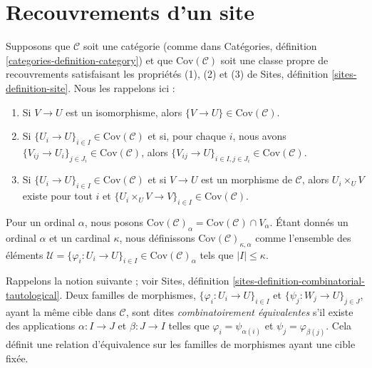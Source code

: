 \section{Recouvrements d'un site}
\label{section-coverings-site}

\noindent
Supposons que $\mathcal{C}$ soit une catégorie (comme dans Catégories,
définition \ref{categories-definition-category}) et que
$\text{Cov}(\mathcal{C})$ soit une classe propre de recouvrements satisfaisant
les propriétés (1), (2) et (3) de Sites,
définition \ref{sites-definition-site}. Nous les rappelons ici :
\begin{enumerate}
\item Si $V \to U$ est un isomorphisme, alors $\{V \to U\} \in
\text{Cov}(\mathcal{C})$.
\item Si $\{U_i \to U\}_{i\in I} \in \text{Cov}(\mathcal{C})$ et si, pour
chaque $i$, nous avons
$\{V_{ij} \to U_i\}_{j\in J_i} \in \text{Cov}(\mathcal{C})$, alors
$\{V_{ij} \to U\}_{i \in I, j\in J_i} \in \text{Cov}(\mathcal{C})$.
\item Si $\{U_i \to U\}_{i\in I}\in \text{Cov}(\mathcal{C})$ et si
$V \to U$ est un morphisme de $\mathcal{C}$, alors $U_i \times_U V$ existe
pour tout $i$ et
$\{U_i \times_U V \to V \}_{i\in I} \in \text{Cov}(\mathcal{C})$.
\end{enumerate}
Pour un ordinal $\alpha$, nous posons
$\text{Cov}(\mathcal{C})_\alpha = \text{Cov}(\mathcal{C}) \cap V_\alpha$.
Étant donnés un ordinal $\alpha$ et un cardinal $\kappa$, nous définissons
$\text{Cov}(\mathcal{C})_{\kappa, \alpha}$ comme l'ensemble des éléments
$\mathcal{U} =
\{\varphi_i : U_i \to U\}_{i\in I} \in \text{Cov}(\mathcal{C})_\alpha$
tels que $|I| \leq \kappa$.

\medskip\noindent
Rappelons la notion suivante ; voir Sites,
définition \ref{sites-definition-combinatorial-tautological}.
Deux familles de morphismes, $\{\varphi_i : U_i \to U\}_{i\in I}$ et
$\{\psi_j : W_j \to U\}_{j\in J}$, ayant la même cible dans $\mathcal{C}$,
sont dites {\it combinatoirement équivalentes} s'il existe des applications
$\alpha : I \to J$ et $\beta : J\to I$ telles que
$\varphi_i = \psi_{\alpha(i)}$ et $\psi_j = \varphi_{\beta(j)}$.
Cela définit une relation d'équivalence sur les familles de morphismes ayant
une cible fixée.

